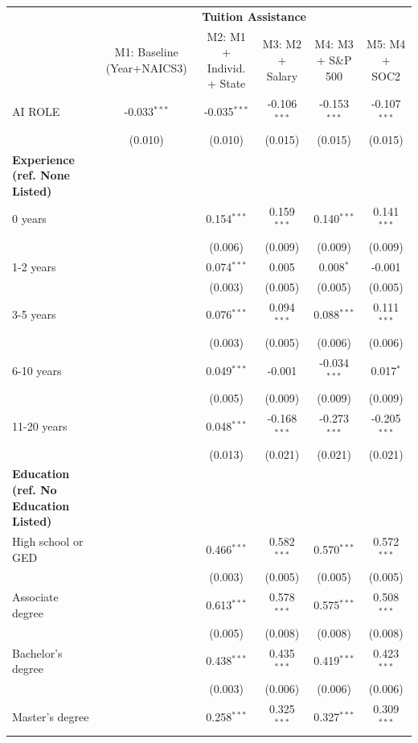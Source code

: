 \begin{table}[!htbp]
\centering
\tiny
\begin{tabular}{lccccc}
\toprule
 & \multicolumn{5}{c}{\textbf{Tuition Assistance}} \\
 & M1: Baseline (Year+NAICS3) & M2: M1 + Individ. + State & M3: M2 + Salary & M4: M3 + S\&P 500 & M5: M4 + SOC2 \\
\midrule
AI ROLE & -0.033$^{***}$ & -0.035$^{***}$ & -0.106$^{***}$ & -0.153$^{***}$ & -0.107$^{***}$ \\
 & (0.010) & (0.010) & (0.015) & (0.015) & (0.015) \\
\midrule
\textbf{Experience (ref. None Listed)} &  &  &  &  &  \\
0 years &  & 0.154$^{***}$ & 0.159$^{***}$ & 0.140$^{***}$ & 0.141$^{***}$ \\
 &  & (0.006) & (0.009) & (0.009) & (0.009) \\
1-2 years &  & 0.074$^{***}$ & 0.005 & 0.008$^{*}$ & -0.001 \\
 &  & (0.003) & (0.005) & (0.005) & (0.005) \\
3-5 years &  & 0.076$^{***}$ & 0.094$^{***}$ & 0.088$^{***}$ & 0.111$^{***}$ \\
 &  & (0.003) & (0.005) & (0.006) & (0.006) \\
6-10 years &  & 0.049$^{***}$ & -0.001 & -0.034$^{***}$ & 0.017$^{*}$ \\
 &  & (0.005) & (0.009) & (0.009) & (0.009) \\
11-20 years &  & 0.048$^{***}$ & -0.168$^{***}$ & -0.273$^{***}$ & -0.205$^{***}$ \\
 &  & (0.013) & (0.021) & (0.021) & (0.021) \\
\midrule
\textbf{Education (ref. No Education Listed)} &  &  &  &  &  \\
High school or GED &  & 0.466$^{***}$ & 0.582$^{***}$ & 0.570$^{***}$ & 0.572$^{***}$ \\
 &  & (0.003) & (0.005) & (0.005) & (0.005) \\
Associate degree &  & 0.613$^{***}$ & 0.578$^{***}$ & 0.575$^{***}$ & 0.508$^{***}$ \\
 &  & (0.005) & (0.008) & (0.008) & (0.008) \\
Bachelor's degree &  & 0.438$^{***}$ & 0.435$^{***}$ & 0.419$^{***}$ & 0.423$^{***}$ \\
 &  & (0.003) & (0.006) & (0.006) & (0.006) \\
Master's degree &  & 0.258$^{***}$ & 0.325$^{***}$ & 0.327$^{***}$ & 0.309$^{***}$ \\

\end{tabular}
\end{table}
